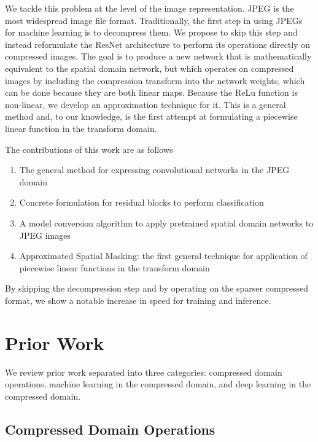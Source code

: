 \documentclass[10pt,twocolumn,letterpaper]{article}
\begin{document}
We tackle this problem at the level of the image representation. JPEG is the most widespread image file format. Traditionally, the first step in using JPEGs for machine learning is to decompress them. We propose to skip this step and instead reformulate the ResNet architecture to perform its operations directly on compressed images. The goal is to produce a new network that is mathematically equivalent to the spatial domain network, but which operates on compressed images by including the compression transform into the network weights, which can be done because they are both linear maps. Because the ReLu function is non-linear, we develop an approximation technique for it. This is a general method and, to our knowledge, is the first attempt at formulating a piecewise linear function in the transform domain.

The contributions of this work are as follows
\begin{enumerate}
    \item The general method for expressing convolutional networks in the JPEG domain
    \item Concrete formulation for residual blocks to perform classification
    \item A model conversion algorithm to apply pretrained spatial domain networks to JPEG images
    \item Approximated Spatial Masking: the first general technique for application of piecewise linear functions in the transform domain
\end{enumerate}
By skipping the decompression step and by operating on the sparser compressed format, we show a notable increase in speed for training and inference.\section{Prior Work}

We review prior work separated into three categories: compressed domain operations, machine learning in the compressed domain, and deep learning in the compressed domain.

\subsection{Compressed Domain Operations}
\end{document}
